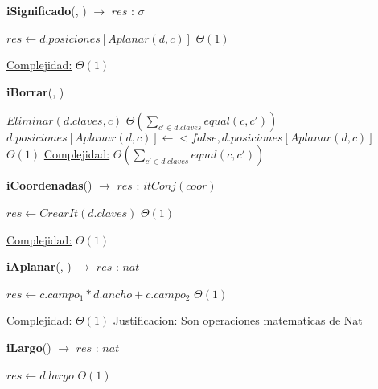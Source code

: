 \begin{Algoritmos}
\begin{algorithm}[H]{\textbf{iSignificado}(, ) $\to$ $res$ : $\sigma$}
    	\begin{algorithmic}[1]
            \State $res \gets d.posiciones[Aplanar(d, c)]$ \Comment $\Theta(1)$
			
			\medskip
			\Statex \underline{Complejidad:} $\Theta(1)$
        \end{algorithmic}
\end{algorithm}

\begin{algorithm}[H]{\textbf{iBorrar}(, )}
    	\begin{algorithmic}[1]
            \State $Eliminar(d.claves, c)$ \Comment $\Theta\left(\displaystyle\sum_{c' \in d.claves}equal(c,c')\right)$
            \State $d.posiciones[Aplanar(d, c)] \gets <false, d.posiciones[Aplanar(d, c)]$ \Comment $\Theta(1)$
			\medskip
			\Statex \underline{Complejidad:} $\Theta\left(\displaystyle\sum_{c' \in d.claves}equal(c,c')\right)$
        \end{algorithmic}
\end{algorithm}

\begin{algorithm}[H]{\textbf{iCoordenadas}() $\to$ $res$ : $itConj(coor)$}
    	\begin{algorithmic}[1]
            \State $res \gets CrearIt(d.claves)$ \Comment $\Theta(1)$

			\medskip
			\Statex \underline{Complejidad:} $\Theta(1)$
        \end{algorithmic}
\end{algorithm}

\begin{algorithm}[H]{\textbf{iAplanar}(, ) $\to$ $res$ : $nat$}
    	\begin{algorithmic}[1]
			\State $res \gets c.campo_1 * d.ancho + c.campo_2 $ \Comment $\Theta(1)$
			
			\medskip
			\Statex \underline{Complejidad:} $\Theta(1)$
            \Statex \underline{Justificacion:} Son operaciones matematicas de Nat
        \end{algorithmic}
\end{algorithm}

\begin{algorithm}[H]{\textbf{iLargo}() $\to$ $res$ : $nat$}
    	\begin{algorithmic}[1]
            \State $res \gets d.largo$ \Comment $\Theta(1)$


\end{algorithmic}
\end{algorithm}
\end{Algoritmos}
